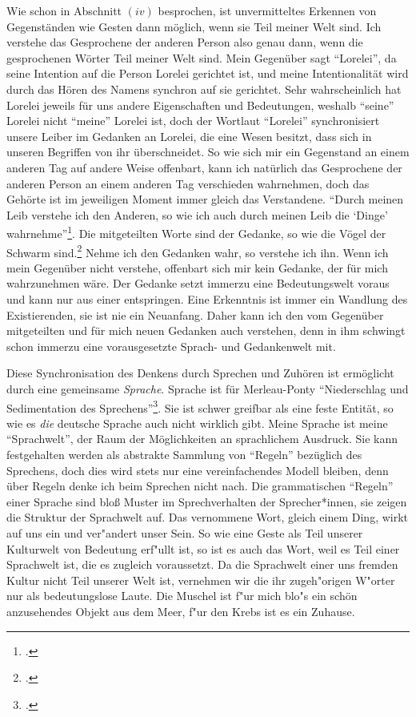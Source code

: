 \documentclass[a4paper, 12pt]{article}
\begin{document}
\begin{onehalfspace}
Wie schon in Abschnitt $(iv)$ besprochen, ist unvermitteltes Erkennen von Gegenständen wie Gesten dann möglich, wenn sie Teil meiner Welt sind. Ich verstehe das Gesprochene der anderen Person also genau dann, wenn die gesprochenen Wörter Teil meiner Welt sind. Mein Gegenüber sagt "`Lorelei"', da seine Intention auf die Person Lorelei gerichtet ist, und meine Intentionalität wird durch das Hören des Namens synchron auf sie gerichtet. Sehr wahrscheinlich hat Lorelei jeweils für uns andere Eigenschaften und Bedeutungen, weshalb "`seine"' Lorelei nicht "`meine"' Lorelei ist, doch der Wortlaut "`Lorelei"' synchronisiert unsere Leiber im Gedanken an Lorelei, die eine Wesen besitzt, dass sich in unseren Begriffen von ihr überschneidet. So wie sich mir ein Gegenstand an einem anderen Tag auf andere Weise offenbart, kann ich natürlich das Gesprochene der anderen Person an einem anderen Tag verschieden wahrnehmen, doch das Gehörte ist im jeweiligen Moment immer gleich das Verstandene. "`Durch meinen Leib verstehe ich den Anderen, so wie ich auch durch meinen Leib die `Dinge' wahrnehme"'\footnote{\Cite[Siehe][S. 220]{merleau1966phanomenologie}.}. Die mitgeteilten Worte sind der Gedanke, so wie die Vögel der Schwarm sind.\footnote{\Cite[Vgl.][S. 217]{merleau1966phanomenologie}.} Nehme ich den Gedanken wahr, so verstehe ich ihn. Wenn ich mein Gegenüber nicht verstehe, offenbart sich mir kein Gedanke, der für mich wahrzunehmen wäre. Der Gedanke setzt immerzu eine Bedeutungswelt voraus und kann nur aus einer entspringen. Eine Erkenntnis ist immer ein Wandlung des Existierenden, sie ist nie ein Neuanfang. Daher kann ich den vom Gegenüber mitgeteilten und für mich neuen Gedanken auch verstehen, denn in ihm schwingt schon immerzu eine vorausgesetzte Sprach- und Gedankenwelt mit. 

Diese Synchronisation des Denkens durch Sprechen und Zuhören ist ermöglicht durch eine gemeinsame \emph{Sprache}. Sprache ist für Merleau-Ponty "`Niederschlag und Sedimentation des Sprechens"'\footnote{\Cite[Siehe][S. 232]{merleau1966phanomenologie}.}. Sie ist schwer greifbar als eine feste Entität, so wie es \emph{die} deutsche Sprache auch nicht wirklich gibt. Meine Sprache ist meine "`Sprachwelt"', der Raum der Möglichkeiten an sprachlichem Ausdruck. Sie kann festgehalten werden als abstrakte Sammlung von "`Regeln"' bezüglich des Sprechens, doch dies wird stets nur eine vereinfachendes Modell bleiben, denn über Regeln denke ich beim Sprechen nicht nach. Die grammatischen "`Regeln"' einer Sprache sind bloß Muster im Sprechverhalten der Sprecher*innen, sie zeigen die Struktur der Sprachwelt auf. Das vernommene Wort, gleich einem Ding, wirkt auf uns ein und ver"andert unser Sein. So wie eine Geste als Teil unserer Kulturwelt von Bedeutung erf"ullt ist, so ist es auch das Wort, weil es Teil einer Sprachwelt ist, die es zugleich voraussetzt. Da die Sprachwelt einer uns fremden Kultur nicht Teil unserer Welt ist, vernehmen wir die ihr zugeh"origen W"orter nur als bedeutungslose Laute. Die Muschel ist f"ur mich blo"s ein schön anzusehendes Objekt aus dem Meer, f"ur den Krebs ist es ein Zuhause. 


\end{onehalfspace}
\end{document}
